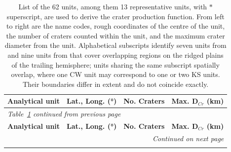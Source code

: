 \documentclass[preprint,11pt,3p,times,authoryear]{elsarticle}
\begin{document}
\begin{longtable}{p{4.0cm} p{3.0cm} p{2.0cm} p{3.0cm}}
\caption{List of the 62 units, among them 13 representative units, with $*$ superscript, are used to derive the crater production function. From left to right are the name codes, rough coordinates of the centre of the unit, the number of craters counted within the unit, and the maximum crater diameter from the unit.
Alphabetical subscripts identify seven units from \citet{CrowWillard2015} and nine units from \citet{Kirchoff2009} that cover overlapping regions on the ridged plains of the trailing hemisphere; units sharing the same subscript spatially overlap, where one CW unit may correspond to one or two KS units. Their boundaries differ in extent and do not coincide exactly.}
\label{tab:analytical_units}\\
\hline
  \textbf{Analytical unit} & \textbf{Lat., Long. (°)} & \textbf{No. Craters} & \textbf{Max. D$_{Cr}$ (km)} \\
\hline
\endfirsthead  %

\multicolumn{4}{l}{\textit{Table~\ref{tab:analytical_units} continued from previous page}}\\
\hline
  \textbf{Analytical unit} & \textbf{Lat., Long. (°)} & \textbf{No. Craters} & \textbf{Max. D$_{Cr}$ (km)} \\
\hline
\endhead       %

\hline
\multicolumn{4}{r}{\textit{Continued on next page}}\\
\endfoot       %

\hline
\endlastfoot   %


\end{longtable}
\end{document}
